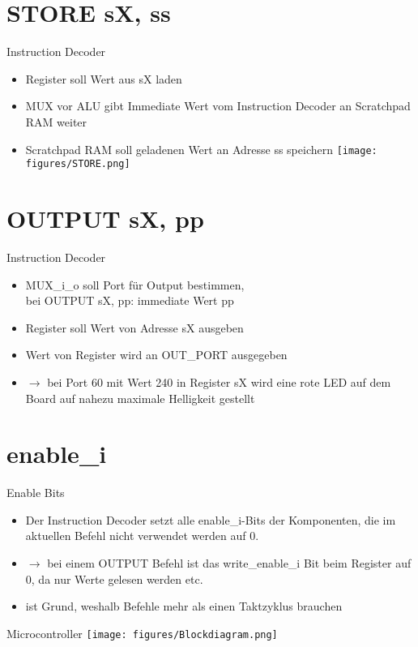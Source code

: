 \documentclass[10pt, t,
aspectratio=169,%
usenames,
dvipsnames,
]{beamer}
\begin{document}
	\section{STORE sX, ss}

	\begin{frame}{Instruction Decoder}
		\begin{itemize}
			\item Register soll Wert aus sX laden
			\item MUX vor ALU gibt Immediate Wert vom Instruction Decoder an Scratchpad RAM weiter
			\item Scratchpad RAM soll geladenen Wert an Adresse ss speichern
			\texttt{[image: figures/STORE.png]}
		\end{itemize}
	\end{frame}

	\section{OUTPUT sX, pp}
	
	\begin{frame}{Instruction Decoder}
		\begin{itemize}
			\item MUX\_i\_o soll Port für Output bestimmen, \\ bei OUTPUT sX, pp: immediate Wert pp
			\item Register soll Wert von Adresse sX ausgeben
			\item Wert von Register wird an OUT\_PORT ausgegeben
			\item $\rightarrow$ bei Port 60 mit Wert 240 in Register sX wird eine rote LED auf dem Board auf nahezu maximale Helligkeit gestellt
		\end{itemize}
	\end{frame}
	
	\section{enable\_i}
	
	\begin{frame}{Enable Bits}
		\begin{itemize}
			\item Der Instruction Decoder setzt alle enable\_i-Bits der Komponenten, die im aktuellen Befehl nicht verwendet werden auf 0.
			\item $\rightarrow$ bei einem OUTPUT Befehl ist das write\_enable\_i Bit beim Register auf 0, da nur Werte gelesen werden etc.
			\item ist Grund, weshalb Befehle mehr als einen Taktzyklus brauchen
		\end{itemize}
	\end{frame}

	\begin{frame}{Microcontroller}
		\texttt{[image: figures/Blockdiagram.png]}
	\end{frame}
\end{document}
